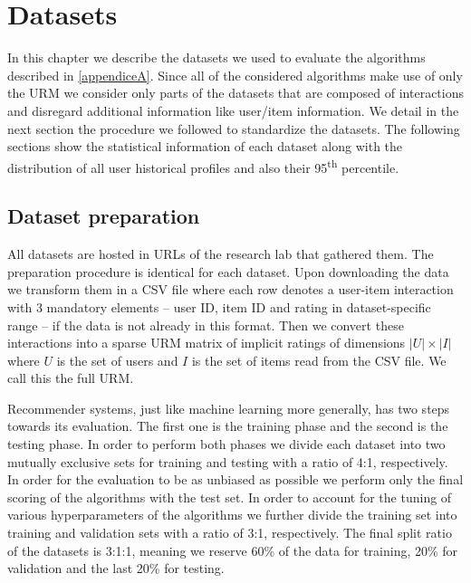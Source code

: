 \chapter{Datasets}
\label{datasets}
\thispagestyle{empty}



\noindent In this chapter we describe the datasets we used to evaluate the algorithms described in \ref{appendiceA}. Since all of the considered algorithms make use of only the URM we consider only parts of the datasets that are composed of interactions and disregard additional information like user/item information. We detail in the next section the procedure we followed to standardize the datasets. The following sections show the statistical information of each dataset along with the distribution of all user historical profiles and also their 95\textsuperscript{th} percentile.

\section{Dataset preparation}


All datasets are hosted in URLs of the research lab that gathered them. The preparation procedure is identical for each dataset. Upon downloading the data we transform them in a CSV file where each row denotes a user-item interaction with 3 mandatory elements -- user ID, item ID and rating in dataset-specific range -- if the data is not already in this format. Then we convert these interactions into a sparse URM matrix of implicit ratings of dimensions $|U|\times|I|$ where $U$ is the set of users and $I$ is the set of items read from the CSV file. We call this the full URM.

Recommender systems, just like machine learning more generally, has two steps towards its evaluation. The first one is the training phase and the second is the testing phase. In order to perform both phases we divide each dataset into two mutually exclusive sets for training and testing with a ratio of 4:1, respectively. In order for the evaluation to be as unbiased as possible we perform only the final scoring of the algorithms with the test set. In order to account for the tuning of various hyperparameters of the algorithms we further divide the training set into training and validation sets with a ratio of 3:1, respectively. The final split ratio of the datasets is 3:1:1, meaning we reserve 60\% of the data for training, 20\% for validation and the last 20\% for testing.

